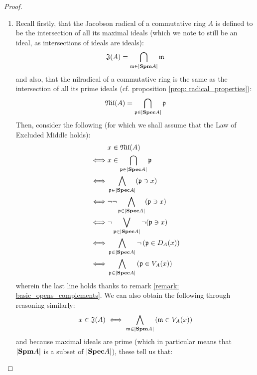 \begin{proof}
\begin{enumerate}
                            One thing to note is that this proof does not imply that every Artinian rings only have finitely many proper ideals. 
                            \item Recall firstly, that the Jacobson radical of a commutative ring $A$ is defined to be the intersection of all its maximal ideals (which we note to still be an ideal, as intersections of ideals are ideals):
                                $$\mathfrak{J}(A) = \bigcap_{\mathfrak{m} \in |\mathbf{Spm} A|} \mathfrak{m}$$
                            and also, that the nilradical of a commutative ring is the same as the intersection of all its prime ideals (cf. proposition \ref{prop: radical_properties}):
                                $$\mathfrak{Nil}(A) = \bigcap_{\mathfrak{p} \in |\mathbf{Spec} A|} \mathfrak{p}$$
                            Then, consider the following (for which we shall assume that the Law of Excluded Middle holds):
                                $$
                                    \begin{aligned}
                                        & x \in \mathfrak{Nil}(A)
                                        \\
                                        \iff & x \in \bigcap_{\mathfrak{p} \in |\mathbf{Spec} A|} \mathfrak{p}
                                        \\
                                        \iff & \bigwedge_{\mathfrak{p} \in |\mathbf{Spec} A|} (\mathfrak{p} \ni x)
                                        \\
                                        \iff & \neg \neg \bigwedge_{\mathfrak{p} \in |\mathbf{Spec} A|} (\mathfrak{p} \ni x)
                                        \\
                                        \iff & \neg \bigvee_{\mathfrak{p} \in |\mathbf{Spec} A|} \neg (\mathfrak{p} \ni x)
                                        \\
                                        \iff & \bigwedge_{\mathfrak{p} \in |\mathbf{Spec} A|} \neg \left(\mathfrak{p} \in D_A(x)\right)
                                        \\
                                        \iff & \bigwedge_{\mathfrak{p} \in |\mathbf{Spec} A|} \left(\mathfrak{p} \in V_A(x)\right)
                                    \end{aligned}
                                $$
                            wherein the last line holds thanks to remark \ref{remark: basic_opens_complements}. We can also obtain the following through reasoning similarly:
                                $$x \in \mathfrak{J}(A) \iff \bigwedge_{\mathfrak{m} \in |\mathbf{Spm} A|} \left(\mathfrak{m} \in V_A(x)\right)$$
                            and because maximal ideals are prime (which in particular means that $|\mathbf{Spm} A|$ is a subset of $|\mathbf{Spec} A|$), these tell us that:

\end{enumerate}
\end{proof}
